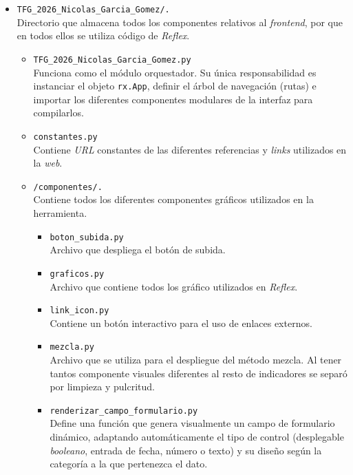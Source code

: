 \begin{itemize}
\begin{itemize}
			\item \texttt{Usuarios.py}\\Constituye el núcleo de seguridad y control de acceso de la aplicación web. Se encarga de gestionar de forma íntegra la autenticación de los usuarios mediante cifrado unidireccional (\textit{Bcrypt}), la validación de credenciales frente a la base de datos y la administración de los diferentes roles y permisos.
		\end{itemize}
			
	\item \texttt{TFG\_2026\_Nicolas\_Garcia\_Gomez/.}\\Directorio que almacena todos los componentes relativos al \textit{frontend}, por que en todos ellos se utiliza código de \textit{Reflex}.
		\begin{itemize}
			\item \texttt{TFG\_2026\_Nicolas\_Garcia\_Gomez.py}\\Funciona como el módulo orquestador. Su única responsabilidad es instanciar el objeto \texttt{rx.App}, definir el árbol de navegación (rutas) e importar los diferentes componentes modulares de la interfaz para compilarlos.
			\item \texttt{constantes.py}\\Contiene \textit{URL} constantes de las diferentes referencias y \textit{links} utilizados en la \textit{web}.
			\item \texttt{/componentes/.}\\Contiene todos los diferentes componentes gráficos utilizados en la herramienta.
				\begin{itemize}
					\item \texttt{boton\_subida.py}\\Archivo que despliega el botón de subida.
					\item \texttt{graficos.py}\\Archivo que contiene todos los gráfico utilizados en \textit{Reflex}.
					\item \texttt{link\_icon.py}\\Contiene un botón interactivo para el uso de enlaces externos.
					\item \texttt{mezcla.py}\\Archivo que se utiliza para el despliegue del método mezcla. Al tener tantos componente visuales diferentes al resto de indicadores se separó por limpieza y pulcritud.
					\item \texttt{renderizar\_campo\_formulario.py}\\Define una función que genera visualmente un campo de formulario dinámico, adaptando automáticamente el tipo de control (desplegable \textit{booleano}, entrada de fecha, número o texto) y su diseño según la categoría a la que pertenezca el dato.

\end{itemize}
\end{itemize}
\end{itemize}
